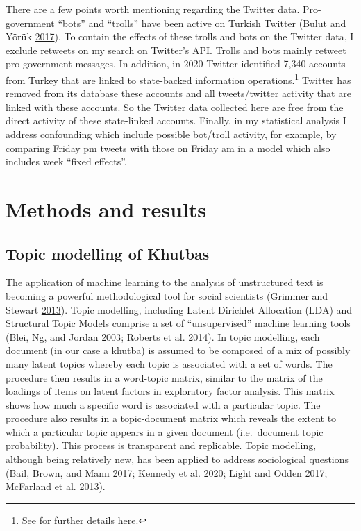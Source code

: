 \documentclass[
  12pt,
]{article}
\begin{document}
There are a few points worth mentioning regarding the Twitter data. Pro-government ``bots'' and ``trolls'' have been active on Turkish Twitter (Bulut and Yörük \protect\hyperlink{ref-bulut2017mediatized}{2017}). To contain the effects of these trolls and bots on the Twitter data, I exclude retweets on my search on Twitter's API. Trolls and bots mainly retweet pro-government messages. In addition, in 2020 Twitter identified 7,340 accounts from Turkey that are linked to state-backed information operations.\footnote{See for further details \href{https://blog.twitter.com/en_us/topics/company/2020/information-operations-june-2020.html}{here}.} Twitter has removed from its database these accounts and all tweets/twitter activity that are linked with these accounts. So the Twitter data collected here are free from the direct activity of these state-linked accounts. Finally, in my statistical analysis I address confounding which include possible bot/troll activity, for example, by comparing Friday pm tweets with those on Friday am in a model which also includes week ``fixed effects''.

\hypertarget{methods-and-results}{%
\section{Methods and results}\label{methods-and-results}}

\hypertarget{topic-modelling-of-khutbas}{%
\subsection{Topic modelling of Khutbas}\label{topic-modelling-of-khutbas}}

The application of machine learning to the analysis of unstructured text is becoming a powerful methodological tool for social scientists (Grimmer and Stewart \protect\hyperlink{ref-grimmer2013text}{2013}). Topic modelling, including Latent Dirichlet Allocation (LDA) and Structural Topic Models comprise a set of ``unsupervised'' machine learning tools (Blei, Ng, and Jordan \protect\hyperlink{ref-blei2003latent}{2003}; Roberts et al. \protect\hyperlink{ref-roberts2014structural}{2014}). In topic modelling, each document (in our case a khutba) is assumed to be composed of a mix of possibly many latent topics whereby each topic is associated with a set of words. The procedure then results in a word-topic matrix, similar to the matrix of the loadings of items on latent factors in exploratory factor analysis. This matrix shows how much a specific word is associated with a particular topic. The procedure also results in a topic-document matrix which reveals the extent to which a particular topic appears in a given document (i.e.~document topic probability). This process is transparent and replicable. Topic modelling, although being relatively new, has been applied to address sociological questions (Bail, Brown, and Mann \protect\hyperlink{ref-bail2017channeling}{2017}; Kennedy et al. \protect\hyperlink{ref-Racialized}{2020}; Light and Odden \protect\hyperlink{ref-light2017managing}{2017}; McFarland et al. \protect\hyperlink{ref-mcfarland2013differentiating}{2013}).
\end{document}
